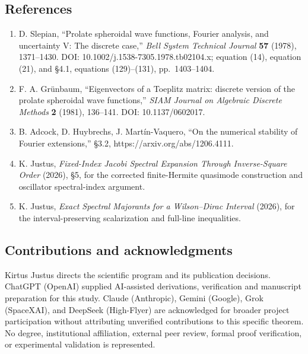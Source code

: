 \documentclass[
  10pt,
  a4paper,
]{article}
\providecommand{\tightlist}{%
  \setlength{\itemsep}{0pt}\setlength{\parskip}{0pt}}
\begin{document}
\newpage

\subsection{References}\label{references}

\begin{enumerate}
\def\labelenumi{\arabic{enumi}.}
\tightlist
\item
  D. Slepian, ``Prolate spheroidal wave functions, Fourier analysis, and uncertainty V: The discrete case,'' \emph{Bell System Technical Journal} \textbf{57} (1978), 1371--1430. DOI: 10.1002/j.1538-7305.1978.tb02104.x; equation (14), equation (21), and §4.1, equations (129)--(131), pp.~1403--1404.
\item
  F. A. Grünbaum, ``Eigenvectors of a Toeplitz matrix: discrete version of the prolate spheroidal wave functions,'' \emph{SIAM Journal on Algebraic Discrete Methods} \textbf{2} (1981), 136--141. DOI: 10.1137/0602017.
\item
  B. Adcock, D. Huybrechs, J. Martín-Vaquero, ``On the numerical stability of Fourier extensions,'' §3.2, https://arxiv.org/abs/1206.4111.
\item
  K. Justus, \emph{Fixed-Index Jacobi Spectral Expansion Through Inverse-Square Order} (2026), §5, for the corrected finite-Hermite quasimode construction and oscillator spectral-index argument.
\item
  K. Justus, \emph{Exact Spectral Majorants for a Wilson--Dirac Interval} (2026), for the interval-preserving scalarization and full-line inequalities.
\end{enumerate}

\subsection{Contributions and acknowledgments}\label{contributions-and-acknowledgments}

Kirtus Justus directs the scientific program and its publication decisions. ChatGPT (OpenAI) supplied AI-assisted derivations, verification and manuscript preparation for this study. Claude (Anthropic), Gemini (Google), Grok (SpaceXAI), and DeepSeek (High-Flyer) are acknowledged for broader project participation without attributing unverified contributions to this specific theorem. No degree, institutional affiliation, external peer review, formal proof verification, or experimental validation is represented.
\end{document}
